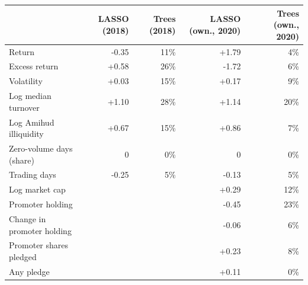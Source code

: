 \begin{tabular*}{\textwidth}[]{l@{\extracolsep\fill}rrrr}
\toprule
 & LASSO (2018) & Trees (2018) & LASSO (own., 2020) & Trees (own., 2020)\\
\midrule
Return & -0.35 & 11\% & +1.79 & 4\%\\
Excess return & +0.58 & 26\% & -1.72 & 6\%\\
Volatility & +0.03 & 15\% & +0.17 & 9\%\\
Log median turnover & +1.10 & 28\% & +1.14 & 20\%\\
Log Amihud illiquidity & +0.67 & 15\% & +0.86 & 7\%\\
Zero-volume days (share) & 0 & 0\% & 0 & 0\%\\
Trading days & -0.25 & 5\% & -0.13 & 5\%\\
Log market cap &  &  & +0.29 & 12\%\\
Promoter holding &  &  & -0.45 & 23\%\\
Change in promoter holding &  &  & -0.06 & 6\%\\
Promoter shares pledged &  &  & +0.23 & 8\%\\
Any pledge &  &  & +0.11 & 0\%\\
\bottomrule
\end{tabular*}
